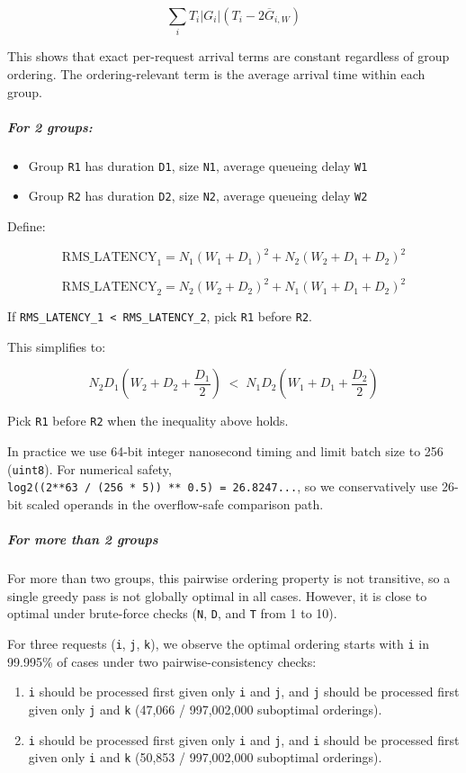 \documentclass{article}
\providecommand{\tightlist}{\setlength{\itemsep}{0pt}\setlength{\parskip}{0pt}}
\begin{document}
\[
\sum_i T_i |G_i| \left(T_i - 2\overline{G}_{i,W}\right)
\]

This shows that exact per-request arrival terms are constant regardless
of group ordering. The ordering-relevant term is the average arrival
time within each group.

\hypertarget{for-2-groups}{%
\subparagraph{For 2 groups:}\label{for-2-groups}}

\begin{itemize}
\tightlist
\item
  Group \texttt{R1} has duration \texttt{D1}, size \texttt{N1}, average
  queueing delay \texttt{W1}
\item
  Group \texttt{R2} has duration \texttt{D2}, size \texttt{N2}, average
  queueing delay \texttt{W2}
\end{itemize}

Define:

\[
\mathrm{RMS\_LATENCY}_1
= N_1 (W_1 + D_1)^2 + N_2 (W_2 + D_1 + D_2)^2
\]

\[
\mathrm{RMS\_LATENCY}_2
= N_2 (W_2 + D_2)^2 + N_1 (W_1 + D_1 + D_2)^2
\]

If \texttt{RMS\_LATENCY\_1\ \textless{}\ RMS\_LATENCY\_2}, pick
\texttt{R1} before \texttt{R2}.

This simplifies to:

\[
N_2 D_1\!\left(W_2 + D_2 + \frac{D_1}{2}\right)
\;<\;
N_1 D_2\!\left(W_1 + D_1 + \frac{D_2}{2}\right)
\]

Pick \texttt{R1} before \texttt{R2} when the inequality above holds.

In practice we use 64-bit integer nanosecond timing and limit batch size
to 256 (\texttt{uint8}). For numerical safety,
\texttt{log2((2**63\ /\ (256\ *\ 5))\ **\ 0.5)\ =\ 26.8247...}, so we
conservatively use 26-bit scaled operands in the overflow-safe
comparison path.

\hypertarget{for-more-than-2-groups}{%
\subparagraph{For more than 2 groups}\label{for-more-than-2-groups}}

For more than two groups, this pairwise ordering property is not
transitive, so a single greedy pass is not globally optimal in all
cases. However, it is close to optimal under brute-force checks
(\texttt{N}, \texttt{D}, and \texttt{T} from 1 to 10).

For three requests (\texttt{i}, \texttt{j}, \texttt{k}), we observe the
optimal ordering starts with \texttt{i} in 99.995\% of cases under two
pairwise-consistency checks:

\begin{enumerate}
\def\labelenumi{\arabic{enumi}.}
\tightlist
\item
  \texttt{i} should be processed first given only \texttt{i} and
  \texttt{j}, and \texttt{j} should be processed first given only
  \texttt{j} and \texttt{k} (47,066 / 997,002,000 suboptimal orderings).
\item
  \texttt{i} should be processed first given only \texttt{i} and
  \texttt{j}, and \texttt{i} should be processed first given only
  \texttt{i} and \texttt{k} (50,853 / 997,002,000 suboptimal orderings).
\end{enumerate}
\end{document}
